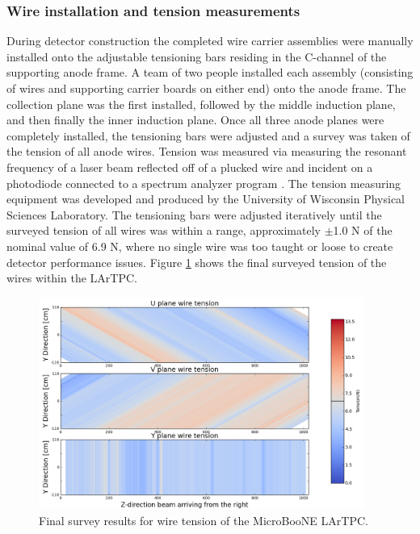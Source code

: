 \subsubsection{Wire installation and tension measurements}
During detector construction the completed wire carrier assemblies were manually installed onto the adjustable tensioning bars residing in the C-channel of the supporting anode frame.  A team of two people installed each assembly (consisting of wires and supporting carrier boards on either end) onto the anode frame.  The collection plane was the first installed, followed by the middle induction plane, and then finally the inner induction plane.  Once all three anode planes were completely installed, the tensioning bars were adjusted and a survey was taken of the tension of all anode wires.  Tension was measured via measuring the resonant frequency of a laser beam reflected off of a plucked wire and incident on a photodiode connected to a spectrum analyzer program \cite{SpectrumLaboratory}.  The tension measuring equipment was developed and produced by the University of Wisconsin Physical Sciences Laboratory.  The tensioning bars were adjusted iteratively until the surveyed tension of all wires was within a range, approximately $\pm$1.0 N of the nominal value of 6.9 N, where no single wire was too taught or loose to create detector performance issues.  Figure \ref{fig:heatmap} shows the final surveyed tension of the wires within the LArTPC.

\begin{figure}[htb]
\centering
\includegraphics[width=0.95\textwidth]{figures/WireTension_201605_updatedcolors.png}
\caption{Final survey results for wire tension of the MicroBooNE LArTPC.}
\label{fig:heatmap}
\end{figure} 




